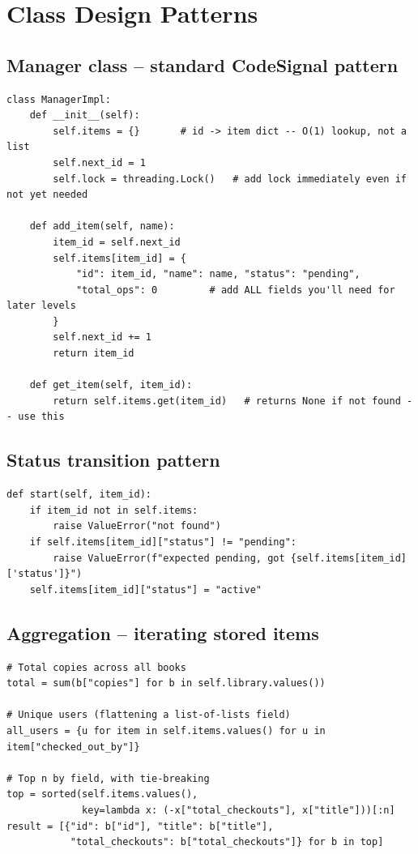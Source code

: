 \documentclass[10pt,letterpaper]{article}
\begin{document}
\section{Class Design Patterns}

\subsection{Manager class -- standard CodeSignal pattern}
\begin{lstlisting}
class ManagerImpl:
    def __init__(self):
        self.items = {}       # id -> item dict -- O(1) lookup, not a list
        self.next_id = 1
        self.lock = threading.Lock()   # add lock immediately even if not yet needed

    def add_item(self, name):
        item_id = self.next_id
        self.items[item_id] = {
            "id": item_id, "name": name, "status": "pending",
            "total_ops": 0         # add ALL fields you'll need for later levels
        }
        self.next_id += 1
        return item_id

    def get_item(self, item_id):
        return self.items.get(item_id)   # returns None if not found -- use this
\end{lstlisting}

\subsection{Status transition pattern}
\begin{lstlisting}
def start(self, item_id):
    if item_id not in self.items:
        raise ValueError("not found")
    if self.items[item_id]["status"] != "pending":
        raise ValueError(f"expected pending, got {self.items[item_id]['status']}")
    self.items[item_id]["status"] = "active"
\end{lstlisting}

\subsection{Aggregation -- iterating stored items}
\begin{lstlisting}
# Total copies across all books
total = sum(b["copies"] for b in self.library.values())

# Unique users (flattening a list-of-lists field)
all_users = {u for item in self.items.values() for u in item["checked_out_by"]}

# Top n by field, with tie-breaking
top = sorted(self.items.values(),
             key=lambda x: (-x["total_checkouts"], x["title"]))[:n]
result = [{"id": b["id"], "title": b["title"],
           "total_checkouts": b["total_checkouts"]} for b in top]
\end{lstlisting}
\end{document}
